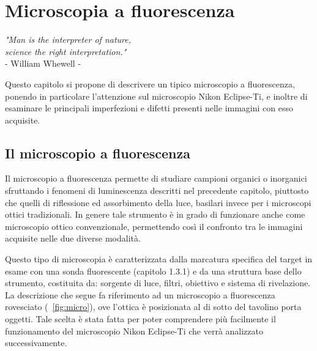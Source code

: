 \clearpage{\pagestyle{empty}\cleardoublepage}

\chapter{Microscopia a fluorescenza}

\begin{flushright}\begin{small}\textit{"Man is the interpreter of nature,\\ 
science the right interpretation."}\\
- William Whewell -\\
\end{small}\end{flushright}

Questo capitolo si propone di descrivere un tipico microscopio a fluorescenza, ponendo in particolare l'attenzione sul microscopio Nikon Eclipse-Ti, e inoltre di esaminare le principali imperfezioni e difetti presenti nelle immagini con esso acquisite.

\section {Il microscopio a fluorescenza}

Il microscopio a fluorescenza permette di studiare campioni organici o inorganici sfruttando i fenomeni di luminescenza descritti nel precedente capitolo, piuttosto che quelli di riflessione ed assorbimento della luce, basilari invece per i microscopi ottici tradizionali. 
In genere tale strumento è in grado di funzionare anche come microscopio ottico convenzionale, permettendo così il confronto tra le immagini acquisite nelle due diverse modalità.

Questo tipo di microscopia è caratterizzata dalla marcatura specifica del target in esame con una sonda fluorescente (capitolo 1.3.1) e da una struttura base dello strumento, costituita da: sorgente di luce, filtri, obiettivo e sistema di rivelazione. 
La descrizione che segue fa riferimento ad un microscopio a fluorescenza rovesciato (\figurename~\ref{fig:micro}), ove l'ottica è posizionata al di sotto del tavolino porta oggetti. 
Tale scelta è stata fatta per poter comprendere più facilmente il funzionamento del microscopio Nikon Eclipse-Ti che verrà analizzato successivamente.

